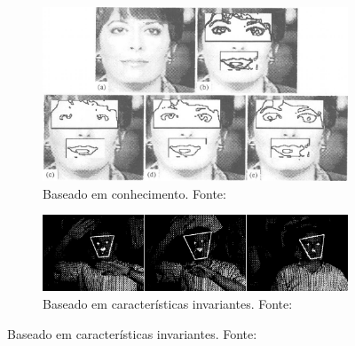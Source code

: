 \begin{figure}[htbp]
    \caption{Exemplos de métodos de detecção facial}
    \label{fig:metodos_deteccao}
    \begin{subfigure}[t]{0.45\textwidth}
    \centering
    \includegraphics[width=\textwidth]{imagens/yang_edge_detection.png}
    \caption{Baseado em conhecimento. Fonte: }
    \end{subfigure}
    \hfill
    \begin{subfigure}[t]{0.45\textwidth}
    \centering
    \includegraphics[width=\textwidth]{imagens/leung.png}
    \caption{Baseado em características invariantes.  Fonte: }
    \end{subfigure}
    

\end{figure}
